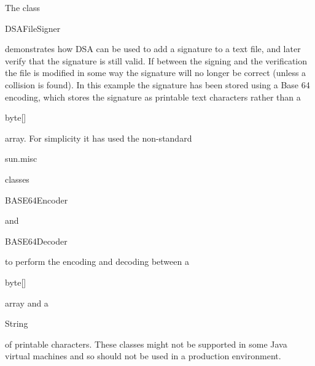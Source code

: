 The class \begin{code}DSAFileSigner\end{code} demonstrates how DSA can be used to add
a signature to a text file, and later verify that the signature is still valid.
If between the signing and the verification the file is modified in some way
the signature will no longer be correct (unless a collision is found).
In this example the signature has been stored using a Base 64 encoding,
which stores the signature as printable text characters rather than a
\begin{code}byte[]\end{code} array.
For simplicity it has used the non-standard \begin{code}sun.misc\end{code} classes
\begin{code}BASE64Encoder\end{code} and \begin{code}BASE64Decoder\end{code}
to perform the encoding and decoding between a \begin{code}byte[]\end{code}
array and a \begin{code}String\end{code} of printable characters.
These classes might not be supported in some Java virtual machines
and so should not be used in a production environment.
